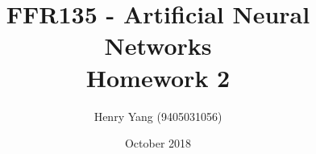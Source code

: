 \documentclass{article}
\author{Henry Yang (9405031056)}
\title{FFR135 - Artificial Neural Networks \\ \large Homework 2}
\date{October 2018}
\begin{document}
\maketitle



\begin{verbatim}
\end{verbatim}
\end{document}
